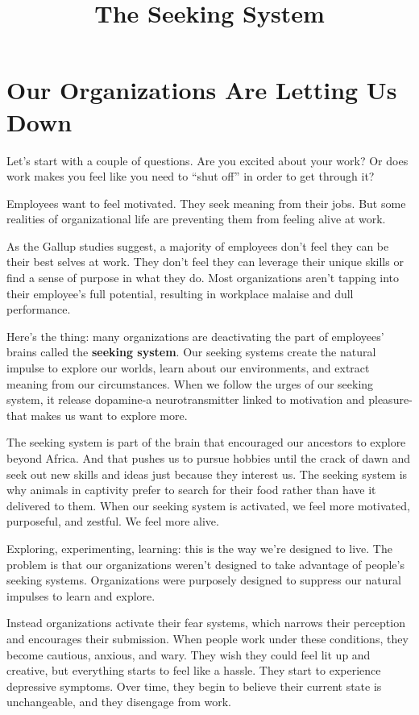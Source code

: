 \documentclass[ebook,12pt,oneside,openany]{memoir}
\begin{document}
\title{The Seeking System}
\maketitle
\section{Our Organizations Are Letting Us Down}

Let's start with a couple of questions.
Are you excited about your work? Or does work makes you feel like you need to ``shut off''
in order to get through it?

Employees want to feel motivated. They seek meaning from their jobs.
But some realities of organizational life are preventing them from feeling alive at work.

As the Gallup studies suggest, a majority of employees don't feel they 
can be their best selves at work. 
They don't feel they can leverage their unique skills or find a sense of purpose 
in what they do. 
Most organizations aren't tapping into their employee's full potential, 
resulting in workplace malaise and dull performance.

Here's the thing: many organizations are deactivating the part of employees'
brains called the \textbf{seeking system}. 
Our seeking systems create the natural impulse to explore our worlds, 
learn about our environments, and extract meaning from our circumstances.
When we follow the urges of our seeking system, it release dopamine-a neurotransmitter linked to 
motivation and pleasure-that makes us want to explore more.

The seeking system is part of the brain that encouraged our ancestors to explore
beyond Africa. And that pushes us to pursue hobbies until the crack of dawn and seek out 
new skills and ideas just because they interest us.
The seeking system is why animals in captivity prefer to search for their food 
rather than have it delivered to them.
When our seeking system is activated, we feel more motivated, purposeful, 
and zestful. We feel more alive.

Exploring, experimenting, learning: this is the way we're designed to live.
The problem is that our organizations weren't designed to take advantage of people's seeking systems.
Organizations were purposely designed to suppress our natural impulses to learn and explore.

Instead organizations activate their fear systems, which narrows their perception and encourages their submission.
When people work under these conditions, they become cautious, anxious, and wary.
They wish they could feel lit up and creative, but everything starts to feel like a hassle.
They start to experience depressive symptoms.
Over time, they begin to believe their current state is unchangeable, and 
they disengage from work.
\end{document}
